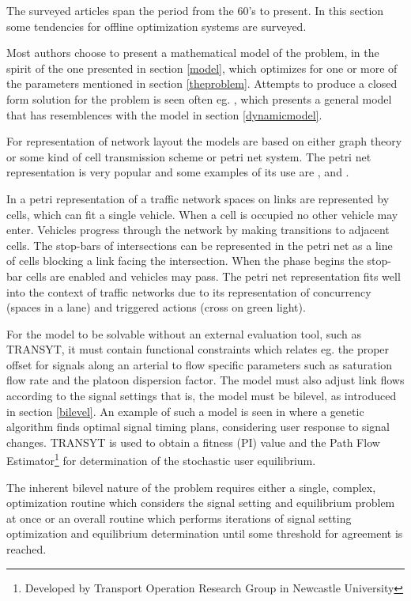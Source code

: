 \label{offline}
The surveyed articles span the period from the 60's to present. In this section some tendencies for offline optimization systems are surveyed.

Most authors choose to present a mathematical model of the problem, in the spirit of the one presented in section \ref{model}, which optimizes for one or more of the parameters mentioned in section \ref{theproblem}. Attempts to produce a closed form solution for the problem is seen often eg. \cite{36}, which presents a general model that has resemblences with the model in section \ref{dynamicmodel}.

For representation of network layout the models are based on either graph theory or some kind of cell transmission scheme or petri net system. The petri net representation is very popular and some examples of its use are \cite{12}, \cite{16} and \cite{petri}.

In a petri representation of a traffic network spaces on links are represented by cells, which can fit a single vehicle. When a cell is occupied no other vehicle may enter. Vehicles progress through the network by making transitions to adjacent cells. The stop-bars of intersections can be represented in the petri net as a line of cells blocking a link facing the intersection. When the phase begins the stop-bar cells are enabled and vehicles may pass.
The petri net representation fits well into the context of traffic networks due to its representation of concurrency (spaces in a lane) and triggered actions (cross on green light).

For the model to be solvable without an external evaluation tool, such as TRANSYT, it must contain functional constraints which relates eg. the proper offset for signals along an arterial to flow specific parameters such as saturation flow rate and the platoon dispersion factor.
The model must also adjust link flows according to the signal settings that is, the model must be bilevel, as introduced in section \ref{bilevel}. An example of such a model is seen in \cite{33} where a genetic algorithm finds optimal signal timing plans, considering user response to signal changes. TRANSYT is used to obtain a fitness (PI) value and the Path Flow Estimator\footnote{Developed by Transport Operation Research Group in Newcastle University} for determination of the stochastic user equilibrium.

The inherent bilevel nature of the problem requires either a single, complex, optimization routine which considers the signal setting and equilibrium problem at once or an overall routine which performs iterations of signal setting optimization and equilibrium determination until some threshold for agreement is reached. 

